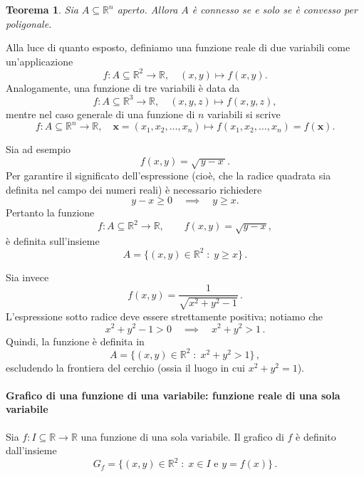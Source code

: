 \documentclass{article}
\theoremstyle{plain}
\newtheorem{thm}{Teorema}[section]
\theoremstyle{definition}
\theoremstyle{remark}
\begin{document}
\vspace{10pt}

\begin{bxthm}
\begin{thm}
    Sia $A\subseteq\mathbb{R}^n$ aperto.
    Allora $A$ è connesso se e solo se è convesso per poligonale.
\end{thm}
\end{bxthm}

\vspace{10pt}

Alla luce di quanto esposto, definiamo una funzione reale di due variabili come un'applicazione
\[
f: A \subseteq \mathbb{R}^2 \to \mathbb{R},\quad (x, y) \mapsto f(x, y).
\]
Analogamente, una funzione di tre variabili è data da
\[
f: A \subseteq \mathbb{R}^3 \to \mathbb{R},\quad (x, y, z) \mapsto f(x, y, z),
\]
mentre nel caso generale di una funzione di $n$ variabili si scrive
\[
f: A \subseteq \mathbb{R}^n \to \mathbb{R},\quad \mathbf{x} = (x_1, x_2, \dots, x_n) \mapsto f(x_1, x_2, \dots, x_n) = f(\mathbf{x}).
\]

\vspace{10pt}


Sia ad esempio 
\[
f(x,y)=\sqrt{\,y-x\,}.
\]
Per garantire il significato dell'espressione (cioè, che la radice quadrata sia definita nel campo dei numeri reali) è necessario richiedere
\[
y-x\ge 0 \quad\implies\quad y\ge x.
\]
Pertanto la funzione 
\[
f \colon A \subseteq \mathbb{R}^2 \to \mathbb{R}, \qquad f(x,y)=\sqrt{y-x},
\]
è definita sull'insieme
\[
A=\{(x,y)\in\mathbb{R}^2 \;:\; y\ge x\}\,.
\]

Sia invece 
\[
f(x,y)=\frac{1}{\sqrt{x^2+y^2-1}}\,.
\]
L'espressione sotto radice deve essere strettamente positiva; notiamo che
\[
x^2+y^2-1>0 \quad\implies\quad x^2+y^2>1\,.
\]
Quindi, la funzione è definita in
\[
A=\{(x,y)\in\mathbb{R}^2 \;:\; x^2+y^2>1\}\,,
\]
escludendo la frontiera del cerchio (ossia il luogo in cui \(x^2+y^2=1\)).


\paragraph{Grafico di una funzione di una variabile: funzione reale di una sola variabile}
Sia \(f : I \subseteq \mathbb{R} \to \mathbb{R}\) una funzione di una sola variabile. Il grafico di \(f\) è definito dall'insieme
\[
G_f=\{(x,y)\in\mathbb{R}^2 \;:\; x\in I \text{ e } y=f(x)\}\,.
\]
\end{document}
